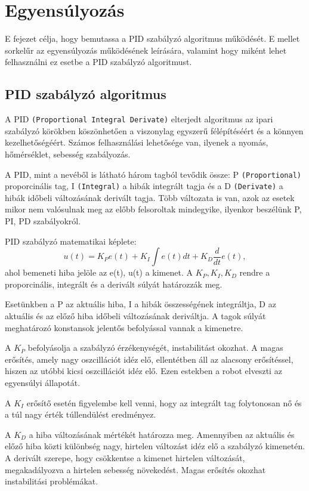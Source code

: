 \chapter{Egyensúlyozás}\label{ch:EGYENSULY}
\begin{osszefoglal}
E fejezet célja, hogy bemutassa a PID szabályzó algoritmus működését. E mellet sorkelűr az egyensúlyozás működésének leírására, valamint hogy miként lehet felhasználni ez esetbe a PID szabályzó algoritmust.
\end{osszefoglal}

\section{PID szabályzó algoritmus}\label{sec:EGYENSULY:pid}
A PID \texttt{(Proportional Integral Derivate)} elterjedt algoritmus az ipari szabályzó körökben köszönhetően a viszonylag egyszerű félépítéséért és a könnyen kezelhetőségéért. Számos felhasználási lehetősége van, ilyenek a nyomás, hőmérséklet, sebesség szabályozás.

A PID, mint a nevéből is látható három tagból tevődik össze: P \texttt{(Proportional)} proporcinális tag, I \texttt{(Integral)} a hibák integrált tagja és a D \texttt{(Derivate)} a hibák időbeli változásának derivált tagja. Több változata is van, azok az esetek mikor nem valósulnak meg az előbb felsoroltak mindegyike, ilyenkor beszélünk P, PI, PD szabályokról.

PID szabályzó matematikai képlete: $$u(t)=K_{P}e(t)+K_{I}\int e(t)dt+K_{D}\frac{d}{dt}e(t),$$ ahol bemeneti hiba jelöle az e(t), u(t) a kimenet. A $K_{P}, K_{I}, K_{D}$ rendre a proporcinális, integrált és a derivált súlyát határozzák meg.

Esetünkben a P az aktuális hiba, I a hibák összességének integráltja, D az aktuális és az előző hiba időbeli változásának deriváltja. A tagok súlyát meghatározó konstansok jelentős befolyással vannak a kimenetre. 

A $K_{P}$ befolyásolja a szabályzó érzékenységét, instabilitást okozhat. A magas erősítés, amely nagy oszcillációt idéz elő, ellentétben áll az alacsony erősítéssel, hiszen az utóbbi kicsi oszcillációt idéz elő. Ezen estekben a robot elveszti az egyensúlyi állapotát. 

A $K_{I}$ erősítő esetén figyelembe kell venni, hogy az integrált tag folytonosan nő és a túl nagy érték túllendülést eredményez. 

A $K_{D}$ a hiba változásának mértékét határozza meg. Amennyiben az aktuális és előző hiba közti különbség nagy, hirtelen változást idéz elő a szabályzó kimenetén. A derivált szerepe, hogy csökkentse a kimenet hirtelen változását, megakadályozva a hirtelen sebesség növekedést. Magas erősítés okozhat instabilitási problémákat.